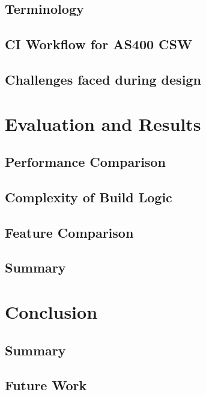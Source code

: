 \documentclass[12pt, a4paper, titlepage]{scrartcl}
\begin{document}
\subsection{Terminology}
\subsection{CI Workflow for AS400 CSW}
\subsection{Challenges faced during design}

\section{Evaluation and Results}
\subsection{Performance Comparison}
\subsection{Complexity of Build Logic}
\subsection{Feature Comparison}
\subsection{Summary}

\section{Conclusion}
\subsection{Summary}
\subsection{Future Work}
\pagebreak





\end{document}
